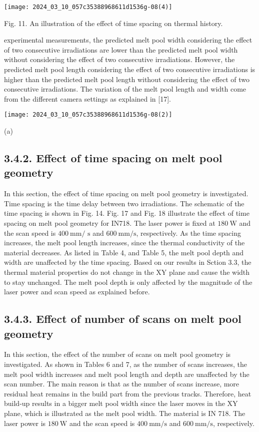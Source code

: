 \documentclass[10pt]{article}
\begin{document}
\begin{center}
\texttt{[image: 2024\_03\_10\_057c35388968611d1536g-08(4)]}
\end{center}

Fig. 11. An illustration of the effect of time spacing on thermal history.

experimental measurements, the predicted melt pool width considering the effect of two consecutive irradiations are lower than the predicted melt pool width without considering the effect of two consecutive irradiations. However, the predicted melt pool length considering the effect of two consecutive irradiations is higher than the predicted melt pool length without considering the effect of two consecutive irradiations. The variation of the melt pool length and width come from the different camera settings as explained in [17].

\begin{center}
\texttt{[image: 2024\_03\_10\_057c35388968611d1536g-08(2)]}
\end{center}

(a)

\subsection*{3.4.2. Effect of time spacing on melt pool geometry}
In this section, the effect of time spacing on melt pool geometry is investigated. Time spacing is the time delay between two irradiations. The schematic of the time spacing is shown in Fig. 14. Fig. 17 and Fig. 18 illustrate the effect of time spacing on melt pool geometry for IN718. The laser power is fixed at $180 \mathrm{~W}$ and the scan speed is $400 \mathrm{~mm} /$ $\mathrm{s}$ and $600 \mathrm{~mm} / \mathrm{s}$, respectively. As the time spacing increases, the melt pool length increases, since the thermal conductivity of the material decreases. As listed in Table 4, and Table 5, the melt pool depth and width are unaffected by the time spacing. Based on our results in Sction 3.3, the thermal material properties do not change in the XY plane and cause the width to stay unchanged. The melt pool depth is only affected by the magnitude of the laser power and scan speed as explained before.

\subsection*{3.4.3. Effect of number of scans on melt pool geometry}
In this section, the effect of the number of scans on melt pool geometry is investigated. As shown in Tables 6 and 7, as the number of scans increases, the melt pool width increases and melt pool length and depth are unaffected by the scan number. The main reason is that as the number of scans increase, more residual heat remains in the build part from the previous tracks. Therefore, heat build-up results in a bigger melt pool width since the laser moves in the XY plane, which is illustrated as the melt pool width. The material is IN 718. The laser power is $180 \mathrm{~W}$ and the scan speed is $400 \mathrm{~mm} / \mathrm{s}$ and $600 \mathrm{~mm} / \mathrm{s}$, respectively.
\end{document}
